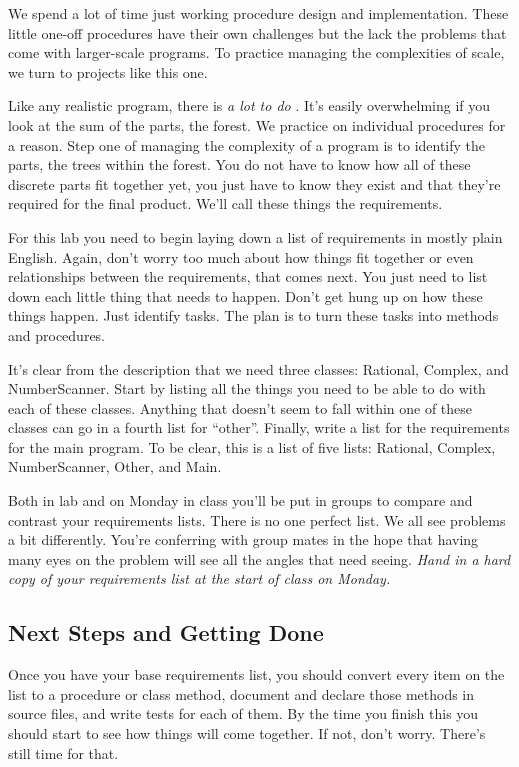 \documentclass[10pt]{article}
\begin{document}
We spend a lot of time just working procedure design and implementation. These little one-off procedures have their own challenges but the lack the problems that come with larger-scale programs. To practice managing the complexities of scale, we turn to projects like this one. 

Like any realistic program, there is \textit{a lot to do} . It's easily overwhelming if you look at the sum of the parts, the forest. We practice on individual procedures for a reason. Step one of managing the complexity of a program is to identify the parts, the trees within the forest. You do not have to know how all of these discrete parts fit together yet, you just have to know they exist and that they're required for the final product. We'll call these things the requirements. 

For this lab you need to begin laying down a list of requirements in mostly plain English. Again, don't worry too much about how things fit together or even relationships between the requirements, that comes next.  You just need to list down each little thing that needs to happen. Don't get hung up on how these things happen. Just identify tasks. The plan is to turn these tasks into methods and procedures. 

It's clear from the description that we need three classes: Rational, Complex, and NumberScanner. Start by listing all the things you need to be able to do with each of these classes.  Anything that doesn't seem to fall within one of these classes can go in a fourth list for ``other''. Finally, write a list for the requirements for the main program. To be clear, this is a list of five lists: Rational, Complex, NumberScanner, Other, and Main. 

Both in lab and on Monday in class you'll be put in groups to compare and contrast your requirements lists. There is no one perfect list. We all see problems a bit differently. You're conferring with group mates in the hope that having many eyes on the problem will see all the angles that need seeing. \textit{Hand in a hard copy of your requirements list at the start of class on Monday.}

\subsection{Next Steps and Getting Done}

Once you have your base requirements list, you should convert every item on the list to a procedure or class method, document and declare those methods in source files, and write tests for each of them. By the time you finish this you should start to see how things will come together. If not, don't worry. There's still time for that.
\end{document}
